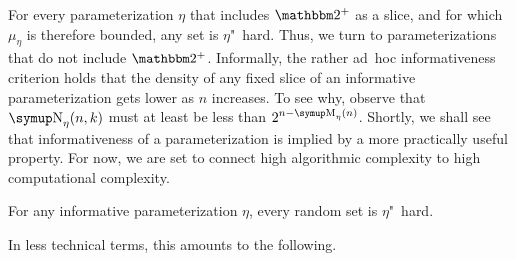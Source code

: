 For every parameterization $\eta$ that includes $\binary^+$ as a slice, and for which $\mu_\eta$ is therefore bounded, any set is $\eta$"~hard.
Thus, we turn to parameterizations that do not include $\binary^+$.
Informally, the rather ad~hoc informativeness criterion holds that the density of any fixed slice of an informative parameterization gets lower as $n$ increases.
To see why, observe that $\upN_\eta(n, k)$ must at least be less than $2^{n - \upM_\eta(n)}$.
Shortly, we shall see that informativeness of a parameterization is implied by a more practically useful property.
For now, we are set to connect high algorithmic complexity to high computational complexity.
\begin{theorem}
\label{thm:randomhard}%
  For any informative parameterization $\eta$, every random set is $\eta$"~hard.
\end{theorem}
In less technical terms, this amounts to the following.
